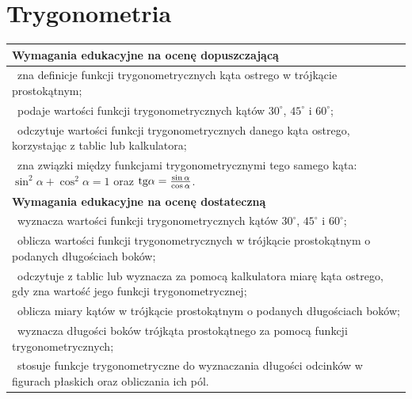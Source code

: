 \documentclass[12pt,a4paper]{article}
\begin{document}
	\section{Trygonometria}
	
	\begin{longtable}{|p{16cm}|}
		\hline
		
		\textbf{Wymagania edukacyjne na ocenę dopuszczającą} \\ \hline
		
		\textbullet\ zna definicje funkcji trygonometrycznych kąta ostrego w trójkącie prostokątnym; \\
		
		\textbullet\ podaje wartości funkcji trygonometrycznych kątów $30^\circ$, $45^\circ$ i $60^\circ$; \\
		
		\textbullet\ odczytuje wartości funkcji trygonometrycznych danego kąta ostrego, korzystając z tablic lub kalkulatora; \\
		
		\textbullet\ zna związki między funkcjami trygonometrycznymi tego samego kąta: $\sin^2\alpha+\cos^2\alpha=1$ oraz $\text{tg}\alpha=\frac{\sin\alpha}{\cos\alpha}$. \\ \hline
		
		\textbf{Wymagania edukacyjne na ocenę dostateczną} \\ \hline
		
		\textbullet\ wyznacza wartości funkcji trygonometrycznych kątów $30^\circ$, $45^\circ$ i $60^\circ$; \\
		
		\textbullet\ oblicza wartości funkcji trygonometrycznych w trójkącie prostokątnym o podanych długościach boków; \\
		
		\textbullet\ odczytuje z tablic lub wyznacza za pomocą kalkulatora miarę kąta ostrego, gdy zna wartość jego funkcji trygonometrycznej; \\
		
		\textbullet\ oblicza miary kątów w trójkącie prostokątnym o podanych długościach boków; \\
		
		\textbullet\ wyznacza długości boków trójkąta prostokątnego za pomocą funkcji trygonometrycznych; \\
		
		\textbullet\ stosuje funkcje trygonometryczne do wyznaczania długości odcinków w figurach płaskich oraz obliczania ich pól. \\ \hline
		

\end{longtable}
\end{document}
